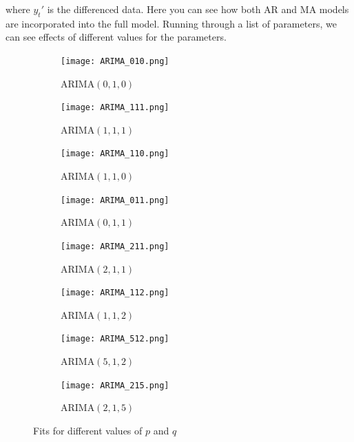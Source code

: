 \documentclass{article}
\begin{document}
  where $y_t'$ is the differenced data.  Here you can see how both AR and MA models are incorporated into the full model.
  \newpage
  Running through a list of parameters, we can see effects of different values for the parameters.
  \begin{figure}[H]
    \centering
    \captionsetup{justification=centering}
    \begin{subfigure}[b]{0.415\linewidth}
      \texttt{[image: ARIMA\_010.png]}
      \caption{ARIMA$(0, 1, 0)$}
    \end{subfigure}
    \begin{subfigure}[b]{0.415\linewidth}
      \texttt{[image: ARIMA\_111.png]}
      \caption{ARIMA$(1, 1, 1)$}
    \end{subfigure}
    \begin{subfigure}[b]{0.415\linewidth}
      \texttt{[image: ARIMA\_110.png]}
      \caption{ARIMA$(1, 1, 0)$}
    \end{subfigure}
    \begin{subfigure}[b]{0.415\linewidth}
      \texttt{[image: ARIMA\_011.png]}
      \caption{ARIMA$(0, 1, 1)$}
    \end{subfigure}
    \begin{subfigure}[b]{0.415\linewidth}
      \texttt{[image: ARIMA\_211.png]}
      \caption{ARIMA$(2, 1, 1)$}
    \end{subfigure}
    \begin{subfigure}[b]{0.415\linewidth}
      \texttt{[image: ARIMA\_112.png]}
      \caption{ARIMA$(1, 1, 2)$}
    \end{subfigure}
    \begin{subfigure}[b]{0.415\linewidth}
      \texttt{[image: ARIMA\_512.png]}
      \caption{ARIMA$(5, 1, 2)$}
    \end{subfigure}
    \begin{subfigure}[b]{0.415\linewidth}
      \texttt{[image: ARIMA\_215.png]}
      \caption{ARIMA$(2, 1, 5)$}
    \end{subfigure}
    \caption{Fits for different values of $p$ and $q$}
  \end{figure}
\end{document}
